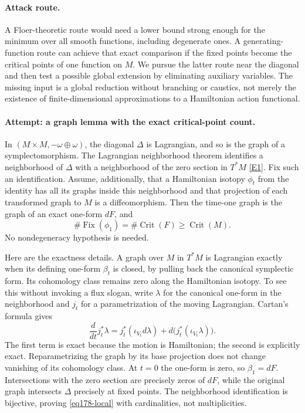 \documentclass[11pt,a4paper]{article}
\newcommand{\eref}[2]{\hyperlink{extra:#1:#2}{[E#2]}}
\numberwithin{equation}{section}
\begin{document}
\paragraph{Attack route.}
A Floer-theoretic route would need a lower bound strong enough for the
minimum over all smooth functions, including degenerate ones. A generating-
function route can achieve that exact comparison if the fixed points become
the critical points of one function on $M$. We pursue the latter route near
the diagonal and then test a possible global extension by eliminating
auxiliary variables. The missing input is a global reduction without
branching or caustics, not merely the existence of finite-dimensional
approximations to a Hamiltonian action functional.

\paragraph{Attempt: a graph lemma with the exact critical-point count.}
In $(M\times M,-\omega\oplus\omega)$, the diagonal $\Delta$ is
Lagrangian, and so is the graph of a symplectomorphism. The Lagrangian
neighborhood theorem identifies a neighborhood of $\Delta$ with a
neighborhood of the zero section in $T^*M$ \eref{178}{1}. Fix such an
identification. Assume, additionally, that a Hamiltonian isotopy $\phi_t$
from the identity has all its graphs inside this neighborhood and that
projection of each transformed graph to $M$ is a diffeomorphism.
Then the time-one graph is the graph of an exact one-form $dF$, and
\begin{equation}\label{eq178-local}
                     \#\operatorname{Fix}(\phi_1)
                         =\#\operatorname{Crit}(F)
                         \ge\operatorname{Crit}(M).
\end{equation}
No nondegeneracy hypothesis is needed.

Here are the exactness details. A graph over $M$ in $T^*M$ is Lagrangian
exactly when its defining one-form $\beta_t$ is closed, by pulling back
the canonical symplectic form. Its cohomology class remains zero along the
Hamiltonian isotopy. To see this without invoking a flux slogan, write
$\lambda$ for the canonical one-form in the neighborhood and $j_t$ for a
parametrization of the moving Lagrangian. Cartan's formula gives
\[
 \frac{d}{dt}j_t^*\lambda
 =j_t^*(\iota_{V_t}d\lambda)+d\bigl(j_t^*(\iota_{V_t}\lambda)\bigr).
\]
The first term is exact because the motion is Hamiltonian; the second is
explicitly exact. Reparametrizing the graph by its base projection does not
change vanishing of its cohomology class. At $t=0$ the one-form is zero,
so $\beta_1=dF$. Intersections with the zero section are precisely zeros
of $dF$, while the original graph intersects $\Delta$ precisely at fixed
points. The neighborhood identification is bijective, proving
\eqref{eq178-local} with cardinalities, not multiplicities.
\end{document}
